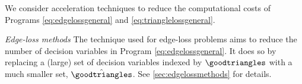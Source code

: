 

We consider acceleration techniques to reduce the computational costs of Programs \eqref{eq:edgelossgeneral} and \eqref{eq:trianglelossgeneral}.

\emph{Edge-loss methods} The technique used for edge-loss problems aims to reduce the number of decision variables in Program \eqref{eq:edgelossgeneral}.  It does so by replacing a (large) set of decision variables indexed by $\goodtriangles$ with a much smaller set, $\hat \goodtriangles$.  See \se \ref{sec:edgelossmethods} for details.


